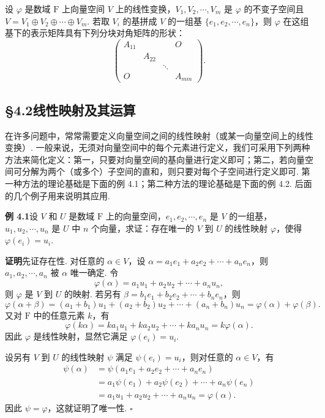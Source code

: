 \documentclass[UTF8,12pt,a4paper,fontset=fandol]{ctexart}
\begin{document}
设 $\varphi$ 是数域 $\mathrm{F}$ 上向量空间 $V$ 上的线性变换，$V_1,V_2,\cdots,V_m$ 是 $\varphi$ 的不变子空间且 $V=V_1\oplus V_2\oplus\cdots\oplus V_m$. 若取 $V_i$ 的基拼成 $V$ 的一组基 $\{e_1,e_2,\cdots,e_n\}$，则 $\varphi$ 在这组基下的表示矩阵具有下列分块对角矩阵的形状：
\[
\left(\begin{array}{cccc}
A_{11} &        &        & O\\
       & A_{22} &        &  \\
       &        & \ddots &  \\
O      &        &        & A_{mm}
\end{array}\right).
\]

\subsection*{§4.2\quad 线性映射及其运算}

在许多问题中，常常需要定义向量空间之间的线性映射（或某一向量空间上的线性变换）. 一般来说，无须对向量空间中的每个元素进行定义，我们可采用下列两种方法来简化定义：第一，只要对向量空间的基向量进行定义即可；第二，若向量空间可分解为两个（或多个）子空间的直和，则只要对每个子空间进行定义即可. 第一种方法的理论基础是下面的例 4.1；第二种方法的理论基础是下面的例 4.2. 后面的几个例子用来说明其应用.

\noindent\textbf{例 4.1}\quad 设 $V$ 和 $U$ 是数域 $\mathrm{F}$ 上的向量空间，$e_1,e_2,\cdots,e_n$ 是 $V$ 的一组基，$u_1,u_2,\cdots,u_n$ 是 $U$ 中 $n$ 个向量，求证：存在唯一的 $V$ 到 $U$ 的线性映射 $\varphi$，使得 $\varphi(e_i)=u_i$.

\noindent\textbf{证明}\quad 先证存在性. 对任意的 $\alpha\in V$，设 $\alpha=a_1e_1+a_2e_2+\cdots+a_ne_n$，则 $a_1,a_2,\cdots,a_n$ 被 $\alpha$ 唯一确定. 令
\[
\varphi(\alpha)=a_1u_1+a_2u_2+\cdots+a_nu_n,
\]
则 $\varphi$ 是 $V$ 到 $U$ 的映射. 若另有 $\beta=b_1e_1+b_2e_2+\cdots+b_ne_n$，则
\[
\varphi(\alpha+\beta)=(a_1+b_1)u_1+(a_2+b_2)u_2+\cdots+(a_n+b_n)u_n
=\varphi(\alpha)+\varphi(\beta).
\]
又对 $\mathrm{F}$ 中的任意元素 $k$，有
\[
\varphi(k\alpha)=ka_1u_1+ka_2u_2+\cdots+ka_nu_n=k\varphi(\alpha).
\]
因此 $\varphi$ 是线性映射，显然它满足 $\varphi(e_i)=u_i$.

设另有 $V$ 到 $U$ 的线性映射 $\psi$ 满足 $\psi(e_i)=u_i$，则对任意的 $\alpha\in V$，有
\[
\begin{aligned}
\psi(\alpha)
&=\psi(a_1e_1+a_2e_2+\cdots+a_ne_n)\\
&=a_1\psi(e_1)+a_2\psi(e_2)+\cdots+a_n\psi(e_n)\\
&=a_1u_1+a_2u_2+\cdots+a_nu_n=\varphi(\alpha).
\end{aligned}
\]
因此 $\psi=\varphi$，这就证明了唯一性. $\square$
\end{document}
